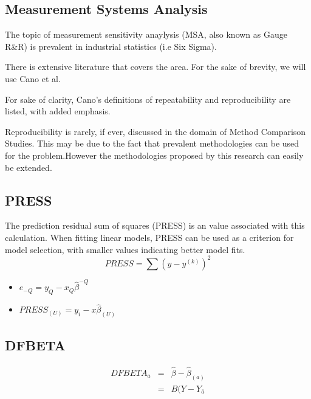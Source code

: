 \documentclass[12pt, a4paper]{report}
\begin{document}
\subsection*{Measurement Systems Analysis}The topic of measurement sensitivity anaylysis (MSA, also known as Gauge R\&R) is prevalent in industrial statistics (i.e Six Sigma).

There is extensive literature that covers the area. For the sake of brevity, we will use Cano et al.

For sake of clarity, Cano's definitions of repeatability and reproducibility are listed, with added emphasis.

Reproducibility is rarely, if ever, discussed in the domain of Method Comparison Studies. This may be due to the fact that prevalent methodologies can be used for the problem.However
the methodologies proposed by this research can easily be extended.



\subsection{PRESS} %
The prediction residual sum of squares (PRESS) is an value associated with this calculation. When fitting linear models, PRESS can be used as a criterion for model selection, with smaller values indicating better model fits.
\begin{equation}
PRESS = \sum(y-y^{(k)})^2
\end{equation}


\begin{itemize}
	\item $e_{-Q} = y_{Q} - x_{Q}\hat{\beta}^{-Q}$
	\item $PRESS_{(U)} = y_{i} - x\hat{\beta}_{(U)}$
\end{itemize}

\subsection{DFBETA} %
\begin{eqnarray}
DFBETA_{a} &=& \hat{\beta} - \hat{\beta}_{(a)} \\
&=& B(Y-Y_{\bar{a}}
\end{eqnarray}

\end{document}
